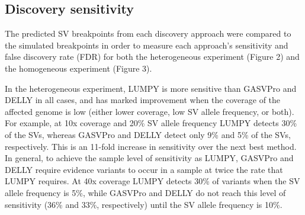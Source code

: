 \documentclass[10pt]{bmc_article}
\newenvironment{bmcformat}{\begin{raggedright}\baselineskip20pt\sloppy\setboolean{publ}{false}}{\end{raggedright}\baselineskip20pt\sloppy}
\begin{document}
\begin{bmcformat}

\subsection*{Discovery sensitivity}
The predicted SV breakpoints from each discovery approach were compared to the
simulated breakpoints in order to measure each approach’s sensitivity and false
discovery rate (FDR) for both the heterogeneous experiment (Figure 2) and the
homogeneous experiment (Figure 3).

In the heterogeneous experiment, LUMPY is more sensitive than GASVPro and DELLY
in all cases, and has marked improvement when the coverage of the affected
genome is low (either lower coverage, low SV allele frequency, or both).  For
example, at 10x coverage and 20\% SV allele frequency LUMPY detects 30\% of the
SVs, whereas GASVPro and DELLY detect only 9\% and 5\% of the SVs, respectively.
This is an 11-fold increase in sensitivity over the next best method.  In
general, to achieve the sample level of sensitivity as LUMPY, GASVPro and DELLY
require evidence variants to occur in a sample at twice the rate that LUMPY
requires.  At 40x coverage LUMPY detects 30\% of variants when the SV allele
frequency is 5\%, while GASVPro and DELLY do not reach this level of sensitivity
(36\% and 33\%, respectively) until the SV allele frequency is 10\%.


\end{bmcformat}
\end{document}
